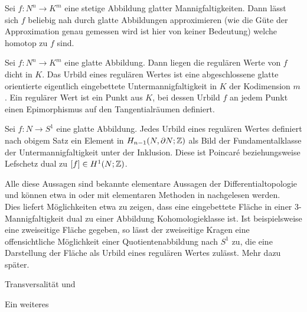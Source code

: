 \begin{bem}
	\begin{thm}
		Sei $f:N^n\to K^m$ eine stetige Abbildung glatter Mannigfaltigkeiten. Dann lässt sich $f$ beliebig nah durch glatte Abbildungen approximieren (wie die Güte der Approximation genau gemessen wird ist hier von keiner Bedeutung) welche homotop zu $f$ sind.
	\end{thm}
	\begin{thm}
		Sei $f:N^n \to K^m$ eine glatte Abbildung. Dann liegen die regulären Werte von $f$ dicht in $K$. Das Urbild eines regulären Wertes ist eine abgeschlossene glatte orientierte eigentlich eingebettete Untermannigfaltigkeit in $K$ der Kodimension $m$. Ein regulärer Wert ist ein Punkt aus $K$, bei dessen Urbild $f$ an jedem Punkt einen Epimorphismus auf den Tangentialräumen definiert. 
	\end{thm}
	\begin{thm}
		Sei $f:N \to S^1$ eine glatte Abbildung. Jedes Urbild eines regulären Wertes definiert nach obigem Satz ein Element in $H_{n-1}(N,\partial N;\mathbb{Z})$ als Bild der Fundamentalklasse der Untermannigfaltigkeit unter der Inklusion. Diese ist Poincaré beziehungsweise Lefschetz dual zu $[f]\in H^1(N;\mathbb{Z})$.
	\end{thm}
	Alle diese Aussagen sind bekannte elementare Aussagen der Differentialtopologie und können etwa in \cite{Kreck.2010} oder mit elementaren Methoden in \cite{Hirsch.1991} nachgelesen werden. \\
	Dies liefert Möglichkeiten etwa zu zeigen, dass eine eingebettete Fläche in einer 3-Mannigfaltigkeit dual zu einer Abbildung Kohomologieklasse ist. Ist beispielsweise eine zweiseitige Fläche gegeben, so lässt der zweiseitige Kragen eine offensichtliche Möglichkeit einer Quotientenabbildung nach $S^1$ zu, die eine Darstellung der Fläche als Urbild eines regulären Wertes zulässt. Mehr dazu später.\\
	\end{bem}
	Transversalität und 
	\begin{bem}[Schnittzahlen]
		Ein weiteres 
	\end{bem}